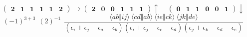 \documentclass[12pt,oneside,a4paper,fleqn]{article}
\begin{document}
\[ \boldsymbol{ \begin{pmatrix} 2 & 1 & 1 & 1 & 1 & 2 \end{pmatrix} \rightarrow \begin{pmatrix} 2 & 0 & 0 & 1 & 1 & 1 \end{pmatrix} \uparrow~~~~~\begin{pmatrix} 0 & 1 & 1 & 0 & 0 & 1 \end{pmatrix} \downarrow } \]
$$(-1)^{3+3}~~(2)^{-1}~~\frac{\langle ab \Vert ij \rangle ~\langle cd \Vert ab \rangle ~\langle ie \Vert ck \rangle ~\langle jk \Vert de \rangle }{(\epsilon_i +\epsilon_j -\epsilon_a -\epsilon_b ) (\epsilon_i +\epsilon_j -\epsilon_c -\epsilon_d ) (\epsilon_j +\epsilon_k -\epsilon_d -\epsilon_e ) }$$
\end{document}
